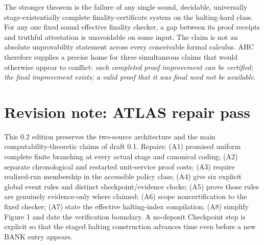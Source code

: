 \documentclass[11pt,letterpaper]{article}
\theoremstyle{definition}
\theoremstyle{remark}
\begin{document}
The stronger theorem is the failure of any single sound, decidable, universally stage-existentially complete finality-certificate system on the halting-hard class. For any one fixed sound effective finality checker, a gap between its proof receipts and truthful attestation is unavoidable on some input. The claim is not an absolute unprovability statement across every conceivable formal calculus. AHC therefore supplies a precise home for three simultaneous claims that would otherwise appear to conflict: \emph{each completed proof improvement can be certified; the final improvement exists; a valid proof that it was final need not be available.}

\section*{Revision note: ATLAS repair pass}
This 0.2 edition preserves the two-source architecture and the main computability-theoretic claims of draft 0.1. Repairs: (A1) promised uniform complete finite branching at every actual stage and canonical coding; (A2) separate chronological and restarted unit-service proof costs; (A3) require realized-run membership in the accessible policy class; (A4) give six explicit global event rules and distinct checkpoint/evidence clocks; (A5) prove those rules are genuinely evidence-only where claimed; (A6) scope noncertification to the fixed checker; (A7) state the effective halting-index compilation; (A8) simplify Figure 1 and date the verification boundary. A no-deposit Checkpoint step is explicit so that the staged halting construction advances time even before a new BANK entry appears.
\end{document}
